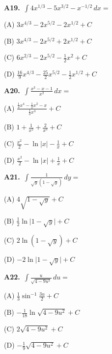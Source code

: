 \documentclass[11pt]{article}
\begin{document}
\bigskip\noindent\textbf{A19.}\ $\displaystyle\int 4x^{1/3}-5x^{3/2}-x^{-1/2}\,dx=$
\begin{list}{}{\setlength{\leftmargin}{3em}\setlength{\labelwidth}{2.5em}\setlength{\itemsep}{0pt}\setlength{\topsep}{2pt}}
\item[(A)] $3x^{4/3}-2x^{5/2}-2x^{1/2}+C$
\item[(B)] $3x^{4/3}-2x^{5/2}+2x^{1/2}+C$
\item[(C)] $6x^{2/3}-2x^{5/2}-\frac12x^2+C$
\item[(D)] $\frac{16}9x^{4/3}-\frac{25}2x^{5/2}-\frac12x^{1/2}+C$
\end{list}

\bigskip\noindent\textbf{A20.}\ $\displaystyle\int \frac{x^3-x-1}{x^2}\,dx=$
\begin{list}{}{\setlength{\leftmargin}{3em}\setlength{\labelwidth}{2.5em}\setlength{\itemsep}{0pt}\setlength{\topsep}{2pt}}
\item[(A)] $\frac{\frac14x^4-\frac12x^2-x}{\frac13x^3}+C$
\item[(B)] $1+\frac1{x^2}+\frac2{x^3}+C$
\item[(C)] $\frac{x^2}2-\ln\lvert x\rvert-\frac1x+C$
\item[(D)] $\frac{x^2}2-\ln\lvert x\rvert+\frac1x+C$
\end{list}

\bigskip\noindent\textbf{A21.}\ $\displaystyle\int \frac1{\sqrt y(1-\sqrt y)}\,dy=$
\begin{list}{}{\setlength{\leftmargin}{3em}\setlength{\labelwidth}{2.5em}\setlength{\itemsep}{0pt}\setlength{\topsep}{2pt}}
\item[(A)] $4\sqrt{1-\sqrt y}+C$
\item[(B)] $\frac12\ln\lvert1-\sqrt y\rvert+C$
\item[(C)] $2\ln(1-\sqrt y)+C$
\item[(D)] $-2\ln\lvert1-\sqrt y\rvert+C$
\end{list}

\bigskip\noindent\textbf{A22.}\ $\displaystyle\int \frac{u}{\sqrt{4-9u^2}}\,du=$
\begin{list}{}{\setlength{\leftmargin}{3em}\setlength{\labelwidth}{2.5em}\setlength{\itemsep}{0pt}\setlength{\topsep}{2pt}}
\item[(A)] $\frac13\sin^{-1}\frac{3u}2+C$
\item[(B)] $-\frac1{18}\ln\sqrt{4-9u^2}+C$
\item[(C)] $2\sqrt{4-9u^2}+C$
\item[(D)] $-\frac19\sqrt{4-9u^2}+C$
\end{list}
\end{document}
